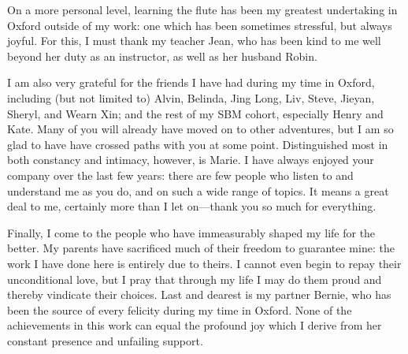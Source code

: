On a more personal level, learning the flute has been my greatest undertaking in Oxford outside of my work: one which has been sometimes stressful, but always joyful.
For this, I must thank my teacher Jean, who has been kind to me well beyond her duty as an instructor, as well as her husband Robin.

I am also very grateful for the friends I have had during my time in Oxford, including (but not limited to) Alvin, Belinda, Jing Long, Liv, Steve, Jieyan, Sheryl, and Wearn Xin; and the rest of my SBM cohort, especially Henry and Kate.
Many of you will already have moved on to other adventures, but I am so glad to have have crossed paths with you at some point.
Distinguished most in both constancy and intimacy, however, is Marie.
I have always enjoyed your company over the last few years:
there are few people who listen to and understand me as you do, and on such a wide range of topics.
It means a great deal to me, certainly more than I let on---thank you so much for everything.

Finally, I come to the people who have immeasurably shaped my life for the better.
My parents have sacrificed much of their freedom to guarantee mine: the work I have done here is entirely due to theirs.
I cannot even begin to repay their unconditional love, but I pray that through my life I may do them proud and thereby vindicate their choices.
Last and dearest is my partner Bernie, who has been the source of every felicity during my time in Oxford.
None of the achievements in this work can equal the profound joy which I derive from her constant presence and unfailing support.
